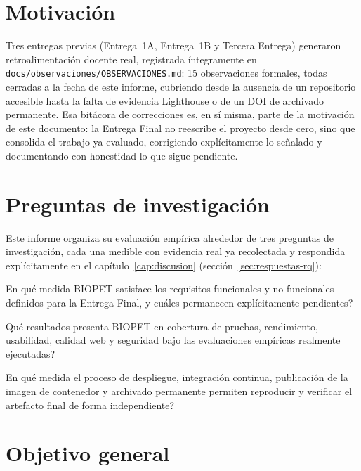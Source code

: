 \section{Motivaci\'on}

Tres entregas previas (Entrega~1A, Entrega~1B y Tercera Entrega) generaron
retroalimentaci\'on docente real, registrada \'integramente en
\texttt{docs/observaciones/OBSERVACIONES.md}: 15 observaciones formales,
todas cerradas a la fecha de este informe, cubriendo desde la ausencia de un
repositorio accesible hasta la falta de evidencia Lighthouse o de un DOI de
archivado permanente. Esa bitácora de correcciones es, en s\'i misma, parte
de la motivaci\'on de este documento: la Entrega Final no reescribe el
proyecto desde cero, sino que consolida el trabajo ya evaluado, corrigiendo
expl\'icitamente lo se\~nalado y documentando con honestidad lo que sigue
pendiente.

\section{Preguntas de investigaci\'on}
\label{sec:preguntas-investigacion}

Este informe organiza su evaluaci\'on emp\'irica alrededor de tres
preguntas de investigaci\'on, cada una medible con evidencia real ya
recolectada y respondida expl\'icitamente en el
cap\'itulo~\ref{cap:discusion} (secci\'on~\ref{sec:respuestas-rq}):

\begin{description}[nosep]
  \item[RQ1.] \textquestiondown En qu\'e medida BIOPET satisface los
    requisitos funcionales y no funcionales definidos para la Entrega
    Final, y cu\'ales permanecen expl\'icitamente pendientes?
  \item[RQ2.] \textquestiondown Qu\'e resultados presenta BIOPET en
    cobertura de pruebas, rendimiento, usabilidad, calidad web y seguridad
    bajo las evaluaciones emp\'iricas realmente ejecutadas?
  \item[RQ3.] \textquestiondown En qu\'e medida el proceso de despliegue,
    integraci\'on continua, publicaci\'on de la imagen de contenedor y
    archivado permanente permiten reproducir y verificar el artefacto
    final de forma independiente?
\end{description}

\section{Objetivo general}

